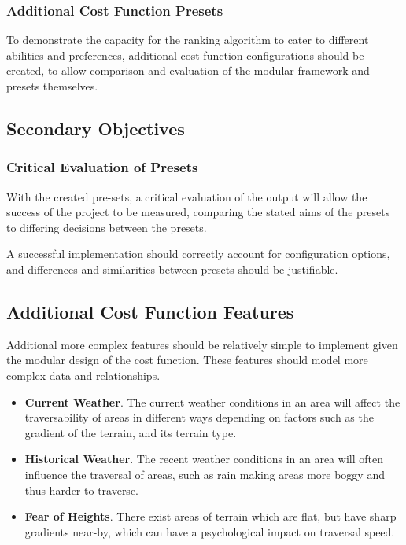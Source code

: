 \documentclass[12pt]{article}
\begin{document}
\subsubsection{Additional Cost Function Presets}

To demonstrate the capacity for the ranking algorithm to cater to different abilities and preferences, additional cost function configurations should be created, to allow comparison and evaluation of the modular framework and presets themselves.

\subsection{Secondary Objectives}

\subsubsection{Critical Evaluation of Presets}

With the created pre-sets, a critical evaluation of the output will allow the success of the project to be measured, comparing the stated aims of the presets to differing decisions between the presets.

A successful implementation should correctly account for configuration options, and differences and similarities between presets should be justifiable.

\subsection{Additional Cost Function Features}

Additional more complex features should be relatively simple to implement given the modular design of the cost function. These features should model more complex data and relationships.

\begin{itemize}
  \item \textbf{Current Weather}. The current weather conditions in an area will affect the traversability of areas in different ways depending on factors such as the gradient of the terrain, and its terrain type.
  \item \textbf{Historical Weather}. The recent weather conditions in an area will often influence the traversal of areas, such as rain making areas more boggy and thus harder to traverse.
  \item \textbf{Fear of Heights}. There exist areas of terrain which are flat, but have sharp gradients near-by, which can have a psychological impact on traversal speed.
\end{itemize}
\end{document}
